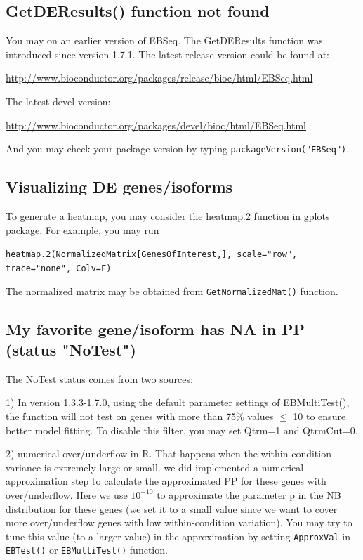 \documentclass{article}
\begin{document}
\subsection{GetDEResults() function not found}

You may on an earlier version of EBSeq. The GetDEResults function
was introduced since version 1.7.1.
The latest release version could be found at:

\url{http://www.bioconductor.org/packages/release/bioc/html/EBSeq.html}

\noindent The latest devel version:

\url{http://www.bioconductor.org/packages/devel/bioc/html/EBSeq.html}

\noindent And you may check your package version by typing \verb+packageVersion("EBSeq")+.


\subsection{Visualizing DE genes/isoforms}

To generate a heatmap, you may consider the heatmap.2 function in gplots package.
For example, you may run

\verb+heatmap.2(NormalizedMatrix[GenesOfInterest,], scale="row", trace="none", Colv=F)+

The normalized matrix may be obtained from \verb+GetNormalizedMat()+ function.


\subsection{My favorite gene/isoform has NA in PP (status "NoTest")}

\indent The NoTest status comes from two sources:

1) In version 1.3.3-1.7.0, using the default parameter settings of EBMultiTest(), the function
will not test on genes with more than 75\% values $\le$ 10 to ensure better
model fitting. To disable this filter, you may set Qtrm=1 and
QtrmCut=0.

2) numerical over/underflow in R. That happens when the within
condition variance is extremely large or small. we did implemented a numerical
approximation step to calculate the approximated PP for these genes
with over/underflow. Here we use $10^{-10}$ to approximate the parameter p
in the NB distribution for these genes (we set it to a small value
since we want to cover more over/underflow genes with low
within-condition variation). You may try to tune this value (to a larger value) in the
approximation by setting \verb+ApproxVal+ in \verb+EBTest()+ or \verb+EBMultiTest()+ function. 

\pagebreak


\end{document}
